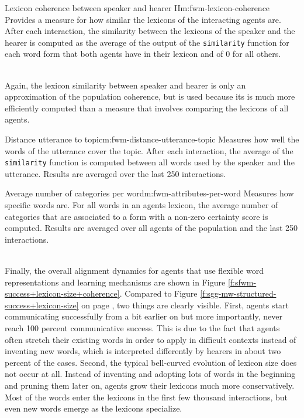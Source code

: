 \stopfiguregroup


\begin{measure}[b]{Lexicon coherence between speaker and
    hearer II}{m:fwm-lexicon-coherence}
  Provides a measure for how similar the lexicons of the interacting
  agents are. After each interaction, the similarity between the
  lexicons of the speaker and the hearer is computed as the average of
  the output of the \texttt{similarity} function for each word form
  that both agents have in their lexicon and of $0$ for all others.

~\\

  Again, the lexicon similarity between speaker and hearer is only an
  approximation of the population coherence, but is used because its
  is much more efficiently computed than a measure that involves
  comparing the lexicons of all agents.
\end{measure}


\begin{measure}[b]{Distance utterance to topic}{m:fwm-distance-utterance-topic}
  Measures how well the words of the utterance cover the topic. After
  each interaction, the average of the \texttt{similarity} function is
  computed between all words used by the speaker and the
  utterance. Results are averaged over the last 250 interactions.
\end{measure}


\begin{measure}[b]{Average number of categories per
    word}{m:fwm-attributes-per-word}
  Measures how specific words are. For all words in an agents lexicon,
  the average number of categories that are associated to a form with
  a non-zero certainty score is computed. Results are averaged over
  all agents of the population and the last 250 interactions.
\end{measure}



~\\

\noindent Finally, the overall alignment dynamics for agents that use
flexible word representations and learning mechanisms are shown in
Figure \ref{f:sfwm-success+lexicon-size+coherence}. Compared to Figure
\ref{f:sgg-mw-structured-success+lexicon-size} on page
\pageref{f:sgg-mw-structured-success+lexicon-size}, two things are
clearly visible. First, agents start communicating successfully from a
bit earlier on but more importantly, never reach 100 percent
communicative success. This is due to the fact that agents often
stretch their existing words in order to apply in difficult contexts
instead of inventing new words, which is interpreted differently by
hearers in about two percent of the cases. Second, the typical
bell-curved evolution of lexicon size does not occur at all. Instead
of inventing and adopting lots of words in the beginning and pruning
them later on, agents grow their lexicons much more
conservatively. Most of the words enter the lexicons in the first few
thousand interactions, but even new words emerge as the lexicons
specialize.

